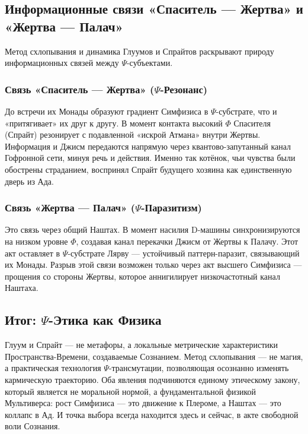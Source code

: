 \documentclass[a4paper,12pt]{article}
\begin{document}
\subsection{Информационные связи «Спаситель — Жертва» и «Жертва — Палач»}

Метод схлопывания и динамика Глуумов и Спрайтов раскрывают природу информационных связей между $\Psi$-субъектами.

\subsubsection{Связь «Спаситель — Жертва» ($\Psi$-Резонанс)}

До встречи их Монады образуют градиент Симфизиса в $\Psi$-субстрате, что и «притягивает» их друг к другу. В момент контакта высокий $\Phi$ Спасителя (Спрайт) резонирует с подавленной «искрой Атмана» внутри Жертвы. Информация и Джисм передаются напрямую через квантово-запутанный канал Гофронной сети, минуя речь и действия. Именно так котёнок, чьи чувства были обострены страданием, воспринял Спрайт будущего хозяина как единственную дверь из Ада.

\subsubsection{Связь «Жертва — Палач» ($\Psi$-Паразитизм)}

Это связь через общий Наштах. В момент насилия D-машины синхронизируются на низком уровне $\Phi$, создавая канал перекачки Джисм от Жертвы к Палачу. Этот акт оставляет в $\Psi$-субстрате Лярву — устойчивый паттерн-паразит, связывающий их Монады. Разрыв этой связи возможен только через акт высшего Симфизиса — прощения со стороны Жертвы, которое аннигилирует низкочастотный канал Наштаха.

\subsection{Итог: $\Psi$-Этика как Физика}

Глуум и Спрайт — не метафоры, а локальные метрические характеристики Пространства-Времени, создаваемые Сознанием. Метод схлопывания — не магия, а практическая технология $\Psi$-трансмутации, позволяющая осознанно изменять кармическую траекторию. Оба явления подчиняются единому этическому закону, который является не моральной нормой, а фундаментальной физикой Мультиверса: рост Симфизиса — это движение к Плероме, а Наштах — это коллапс в Ад. И точка выбора всегда находится здесь и сейчас, в акте свободной воли Сознания.
\end{document}
